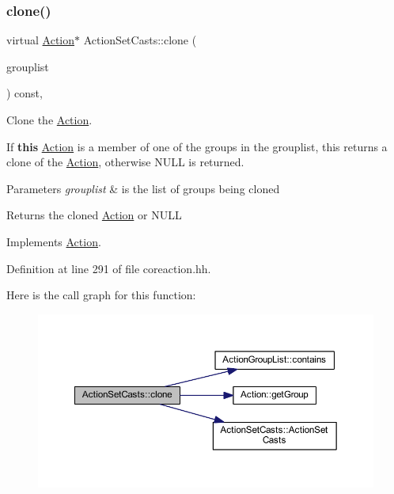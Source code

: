 \subsubsection{\texorpdfstring{clone()}{clone()}}
{\footnotesize\ttfamily virtual \mbox{\hyperlink{class_action}{Action}}$\ast$ Action\+Set\+Casts\+::clone (\begin{DoxyParamCaption}\item[{const \mbox{\hyperlink{class_action_group_list}{Action\+Group\+List}} \&}]{grouplist }\end{DoxyParamCaption}) const\hspace{0.3cm}{\ttfamily [inline]}, {\ttfamily [virtual]}}



Clone the \mbox{\hyperlink{class_action}{Action}}. 

If {\bfseries{this}} \mbox{\hyperlink{class_action}{Action}} is a member of one of the groups in the grouplist, this returns a clone of the \mbox{\hyperlink{class_action}{Action}}, otherwise N\+U\+LL is returned. 
\begin{DoxyParams}{Parameters}
{\em grouplist} & is the list of groups being cloned \\
\hline
\end{DoxyParams}
\begin{DoxyReturn}{Returns}
the cloned \mbox{\hyperlink{class_action}{Action}} or N\+U\+LL 
\end{DoxyReturn}


Implements \mbox{\hyperlink{class_action_af8242e41d09e5df52f97df9e65cc626f}{Action}}.



Definition at line 291 of file coreaction.\+hh.

Here is the call graph for this function\+:
\nopagebreak
\begin{figure}[H]
\begin{center}
\leavevmode
\includegraphics[width=350pt]{class_action_set_casts_abd5deebdb942e64993d2f321b4c1901e_cgraph}
\end{center}
\end{figure}


